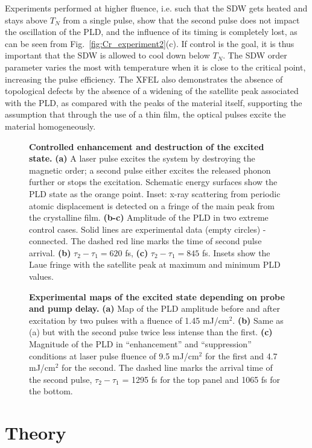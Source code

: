 Experiments performed at higher fluence, i.e. such that the SDW gets heated and stays above $T_N$ from a single pulse, show that the second pulse does not impact the oscillation of the PLD, and the influence of its timing is completely lost, as can be seen from Fig.~\ref{fig:Cr_experiment2}(c).
If control is the goal, it is thus important that the SDW is allowed to cool down below $T_N$.
The SDW order parameter varies the most with temperature when it is close to the critical point, increasing the pulse efficiency.
The XFEL also demonstrates the absence of topological defects by the absence of a widening of the satellite peak associated with the PLD, as compared with the peaks of the material itself, supporting the assumption that through the use of a thin film, the optical pulses excite the material homogeneously. 
\begin{figure}
\caption{\label{fig:Cr_experimental}{\bf Controlled enhancement and destruction of the excited state.} {\bf (a)} A laser pulse excites the system by destroying the magnetic order; a second pulse either excites the released phonon further or stops the excitation. Schematic energy surfaces show the PLD state as the orange point. Inset: x-ray scattering from periodic atomic displacement is detected on a fringe of the main peak from the crystalline film. {\bf (b-c)} Amplitude of the PLD in two extreme control cases. Solid lines are experimental data (empty circles) - connected. The dashed red line marks the time of second pulse arrival. {\bf (b)} $\tau_2 - \tau_1 = 620$ fs, {\bf (c)} $\tau_2 - \tau_1 = 845$ fs. Insets show the Laue fringe with the satellite peak at maximum and minimum PLD values.}
\end{figure}
\begin{figure}
\caption{\label{fig:Cr_experimental2}{\bf Experimental maps of the excited state depending on probe and pump delay.} { \bf (a)} Map of the PLD amplitude before and after excitation by two pulses with a fluence of 1.45 mJ/cm$^2$. {\bf (b)} Same as (a) but with the second pulse twice less intense than the first. {\bf (c)} Magnitude of the PLD in ``enhancement'' and ``suppression'' conditions at laser pulse fluence of 9.5 mJ/cm$^2$ for the first and 4.7 mJ/cm$^2$ for the second. The dashed line marks the arrival time of the second pulse, $\tau_2 - \tau_1$ = 1295 fs for the top panel and 1065 fs for the bottom.}
\end{figure}

\section{Theory}

